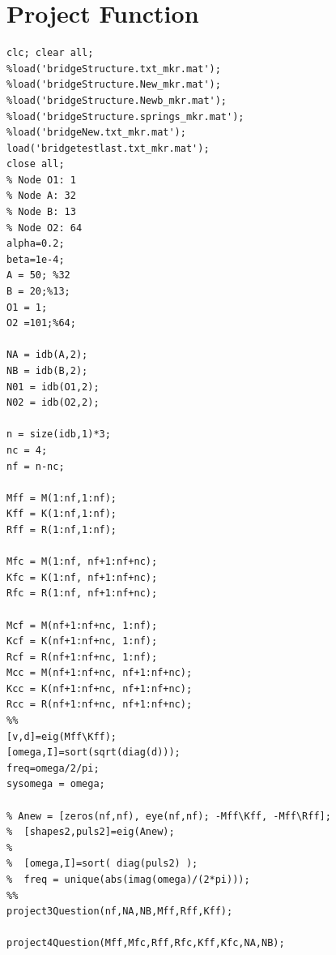 \documentclass[10pt,a4paper,final]{report}
\begin{document}
\section{Project Function}
\begin{lstlisting}
clc; clear all;
%load('bridgeStructure.txt_mkr.mat');
%load('bridgeStructure.New_mkr.mat');
%load('bridgeStructure.Newb_mkr.mat');
%load('bridgeStructure.springs_mkr.mat');
%load('bridgeNew.txt_mkr.mat');
load('bridgetestlast.txt_mkr.mat');
close all;
% Node O1: 1
% Node A: 32
% Node B: 13
% Node O2: 64
alpha=0.2;
beta=1e-4;
A = 50; %32
B = 20;%13;
O1 = 1;
O2 =101;%64;

NA = idb(A,2);
NB = idb(B,2);
N01 = idb(O1,2);
N02 = idb(O2,2);

n = size(idb,1)*3;
nc = 4;
nf = n-nc;

Mff = M(1:nf,1:nf);
Kff = K(1:nf,1:nf);
Rff = R(1:nf,1:nf);

Mfc = M(1:nf, nf+1:nf+nc);
Kfc = K(1:nf, nf+1:nf+nc);
Rfc = R(1:nf, nf+1:nf+nc);

Mcf = M(nf+1:nf+nc, 1:nf);
Kcf = K(nf+1:nf+nc, 1:nf);
Rcf = R(nf+1:nf+nc, 1:nf);
Mcc = M(nf+1:nf+nc, nf+1:nf+nc);
Kcc = K(nf+1:nf+nc, nf+1:nf+nc);
Rcc = R(nf+1:nf+nc, nf+1:nf+nc);
%%
[v,d]=eig(Mff\Kff);
[omega,I]=sort(sqrt(diag(d)));
freq=omega/2/pi;
sysomega = omega;

% Anew = [zeros(nf,nf), eye(nf,nf); -Mff\Kff, -Mff\Rff];
%  [shapes2,puls2]=eig(Anew);
%  
%  [omega,I]=sort( diag(puls2) );
%  freq = unique(abs(imag(omega)/(2*pi)));
%%  
project3Question(nf,NA,NB,Mff,Rff,Kff);

project4Question(Mff,Mfc,Rff,Rfc,Kff,Kfc,NA,NB);

\end{lstlisting}
\newpage
\end{document}
